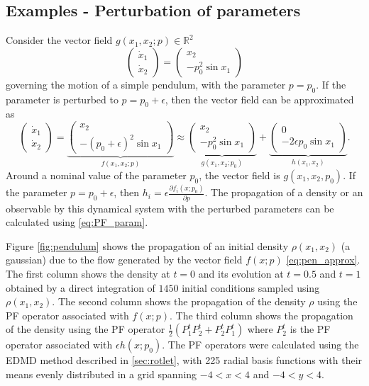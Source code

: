 \documentclass[pdflatex,sn-mathphys]{sn-jnl}%
\theoremstyle{thmstyleone}%
\theoremstyle{thmstyletwo}%
\theoremstyle{thmstylethree}%
\begin{document}
\subsection{Examples - Perturbation of parameters} \label{sec:examples2}
Consider the vector field $g(x_1,x_2;p) \in \mathbb{R}^2$ 
\begin{equation}\label{eq:pendulum}
\begin{pmatrix}
    \dot{x}_1 \\
    \dot{x}_2
\end{pmatrix} 
= {\begin{pmatrix}
 x_2\\
  -p_0^2\sin{x_1}
\end{pmatrix}}
\end{equation}
governing the motion of a simple pendulum, with the parameter $p=p_0$. If the parameter  is perturbed to $p = p_0+\epsilon$, then the vector field can be approximated as
\begin{equation}\label{eq:pen_approx}
\begin{pmatrix}
    \dot{x}_1 \\
    \dot{x}_2
\end{pmatrix} =
\underbrace{\begin{pmatrix}
 x_2\\
  -(p_0+\epsilon)^2\sin{x_1}
\end{pmatrix}}_{f(x_1,x_2; p)}
 \approx
\underbrace{\begin{pmatrix}
 x_2\\
  -p_0^2\sin{x_1}
\end{pmatrix}}_{g(x_1,x_2; p_0)} + \underbrace{\begin{pmatrix}
 0\\
  -2\epsilon p_0\sin{x_1}
\end{pmatrix}}_{h(x_1,x_2)}.
\end{equation}
Around a nominal value of the parameter $p_0$, the vector field is $g(x_1,x_2,p_0)$. If the parameter $p=p_0+\epsilon$, then $h_i = \epsilon \frac{\partial f_i(x;p_0)}{\partial p}$. The propagation of a density or an observable by this dynamical system with the perturbed parameters can be calculated using \eqref{eq:PF_param}. 

Figure  \ref{fig:pendulum} shows the propagation of an initial density $\rho(x_1,x_2)$ (a gaussian) due to the flow generated by the vector field $f(x;p)$ \eqref{eq:pen_approx}. The first column shows the density at $t=0$ and its evolution at $t=0.5$ and $t=1$ obtained by a direct integration of $1450$ initial conditions sampled using $\rho(x_1,x_2)$. The second column shows the propagation of the density $\rho$ using the PF operator associated with $f(x;p)$. The third column shows the propagation of the density using the PF operator $\frac{1}{2}(P_1^tP_2^t + P_2^tP_1^t)$ where $P_2^t$ is the PF operator associated with $\epsilon h(x;p_0)$.
The PF operators were calculated using the EDMD method described in \ref{sec:rotlet}, with 225 radial basis functions with their means evenly distributed in a grid spanning $-4<x<4$ and $-4<y<4$. 
\end{document}
